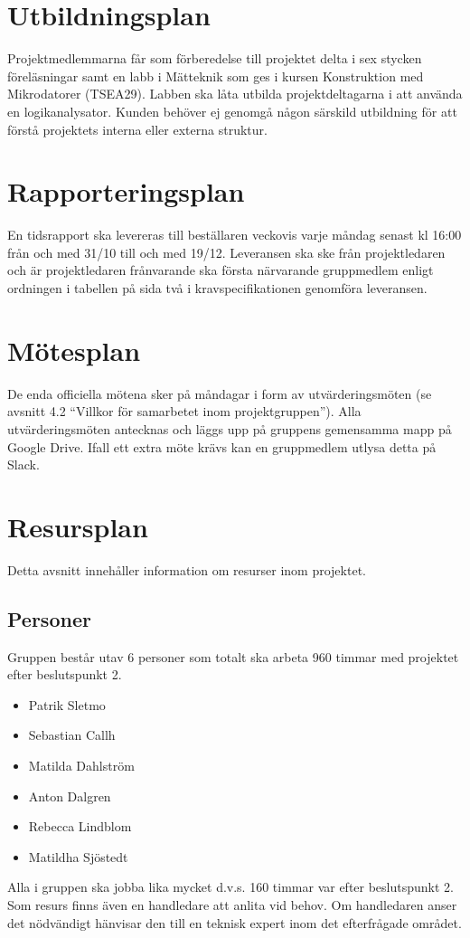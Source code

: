 \documentclass{article}
\begin{document}
\section{Utbildningsplan}
Projektmedlemmarna får som förberedelse till projektet delta i sex stycken föreläsningar samt en labb i Mätteknik som ges i kursen Konstruktion med Mikrodatorer (TSEA29). Labben ska låta utbilda projektdeltagarna i att använda en logikanalysator. Kunden behöver ej genomgå någon särskild utbildning för att förstå projektets interna eller externa struktur.

\section{Rapporteringsplan}
En tidsrapport ska levereras till beställaren veckovis varje måndag senast kl 16:00 från och med 31/10 till och med 19/12. Leveransen ska ske från projektledaren och är projektledaren frånvarande ska första närvarande gruppmedlem enligt ordningen i tabellen på sida två i kravspecifikationen genomföra leveransen.

\section{Mötesplan}
De enda officiella mötena sker på måndagar i form av utvärderingsmöten (se avsnitt 4.2 ``Villkor för samarbetet inom projektgruppen''). Alla utvärderingsmöten antecknas och läggs upp på gruppens gemensamma mapp på Google Drive. Ifall ett extra möte krävs kan en gruppmedlem utlysa detta på Slack.

\section{Resursplan}
Detta avsnitt innehåller information om resurser inom projektet.
\subsection{Personer}
Gruppen består utav 6 personer som totalt ska arbeta 960 timmar med projektet efter beslutspunkt 2.
\begin{itemize}
  \item Patrik Sletmo
  \item Sebastian Callh
  \item Matilda Dahlström
  \item Anton Dalgren
  \item Rebecca Lindblom
  \item Matildha Sjöstedt
\end{itemize}
Alla i gruppen ska jobba lika mycket d.v.s. 160 timmar var efter beslutspunkt 2.
\newline\newline
Som resurs finns även en handledare att anlita vid behov. Om handledaren anser det nödvändigt hänvisar den till en teknisk expert inom det efterfrågade området.
\end{document}
